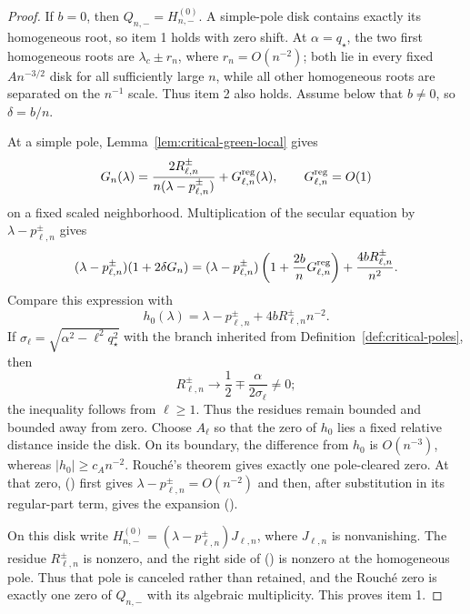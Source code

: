 \documentclass[twoside,10pt]{article}
\numberwithin{equation}{section}
\theoremstyle{slbody}
\theoremstyle{definition}
\theoremstyle{remark}
\renewcommand{\eqref}[1]{%
  \textup{{\normalfont(\oldstylenums{\ref{#1}}}\normalfont)}}
\begin{document}
\begin{proof}
If $b=0$, then $Q_{n,-}=H_{n,-}^{(0)}$.  A simple-pole disk contains
exactly its homogeneous root, so item 1 holds with zero shift.  At
$\alpha=q_\star$, the two first homogeneous roots are
$\lambda_c\pm r_n$, where $r_n=O(n^{-2})$; both lie in every fixed
$An^{-3/2}$ disk for all sufficiently large $n$, while all other
homogeneous roots are separated on the $n^{-1}$ scale.  Thus item 2
also holds.  Assume below that $b\ne0$, so $\delta=b/n$.

At a simple pole, Lemma~\ref{lem:critical-green-local} gives
\[
 G_n(\lambda)=\frac{2R_{\ell,n}^\pm}
  {n(\lambda-p_{\ell,n}^\pm)}+G_{\ell,n}^{\rm reg}(\lambda),
 \qquad G_{\ell,n}^{\rm reg}=O(1)
\]
on a fixed scaled neighborhood.  Multiplication of the secular
equation by $\lambda-p_{\ell,n}^\pm$ gives
\begin{equation}\label{eq:critical-simple-rouche}
 (\lambda-p_{\ell,n}^\pm)(1+2\delta G_n)
 =(\lambda-p_{\ell,n}^\pm)
   \left(1+\frac{2b}{n}G_{\ell,n}^{\rm reg}\right)
   +\frac{4bR_{\ell,n}^\pm}{n^2}.
\end{equation}
Compare this expression with
\[
 h_0(\lambda)=\lambda-p_{\ell,n}^\pm
                  +4bR_{\ell,n}^\pm n^{-2}.
\]
If $\sigma_\ell=\sqrt{\alpha^2-\ell^2q_\star^2}$ with the branch inherited
from Definition~\ref{def:critical-poles}, then
\[
 R_{\ell,n}^\pm\longrightarrow
   \frac12\mp\frac{\alpha}{2\sigma_\ell}\ne0;
\]
the inequality follows from $\ell\ge1$.  Thus the residues remain
bounded and bounded away from zero.  Choose $A_\ell$ so that the zero
of $h_0$ lies a fixed relative
distance inside the disk.  On its boundary, the difference from $h_0$
is $O(n^{-3})$, whereas $|h_0|\ge c_A n^{-2}$.  Rouch\'e's theorem
gives exactly one pole-cleared zero.  At that zero,
\eqref{eq:critical-simple-rouche} first gives
$\lambda-p_{\ell,n}^\pm=O(n^{-2})$ and then, after substitution in its
regular-part term, gives the expansion
\eqref{eq:critical-uniform-simple-shift}.

On this disk write
$H_{n,-}^{(0)}=(\lambda-p_{\ell,n}^\pm)J_{\ell,n}$, where
$J_{\ell,n}$ is nonvanishing.  The residue
$R_{\ell,n}^\pm$ is nonzero, and the right side of
\eqref{eq:critical-simple-rouche} is nonzero at the homogeneous pole.
Thus that pole is canceled rather than retained, and the Rouch\'e zero
is exactly one zero of $Q_{n,-}$ with its algebraic multiplicity.  This
proves item 1.


\end{proof}
\end{document}
